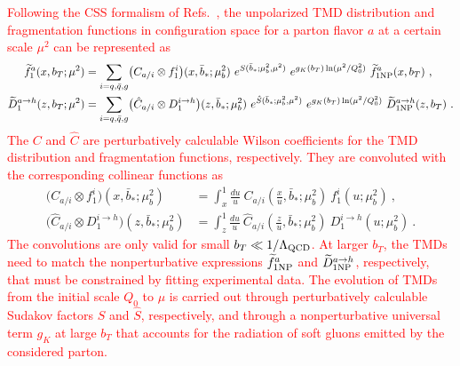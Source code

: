 \documentclass[aps,preprintnumbers,showpacs,nofootinbib,superscriptaddress,floatfix]{revtex4}
\begin{document}
\textcolor{red}{Following the CSS formalism of Refs.~\cite{Collins:2011zzd,Aybat:2011zv}, the unpolarized TMD distribution and fragmentation functions in configuration space for a parton flavor $a$ at a certain scale $\mu^2$ can be represented as}
\begin{align}   
\widetilde{f}_1^a (x,  b_T; \mu^2) &= \sum_{i=q,\bar q,g} \bigl( C_{a/i} \otimes f_1^i \bigr) (x, \bar{b}_{\ast}; \mu_b^2) 
\  e^{S (\bar{b}_{\ast}; \mu_b^2, \mu^2)} \  e^{g_K(b_T) \ln (\mu^2 / Q_0^2)} \  \widetilde{f}_{1 {\rm NP}}^a (x, b_T) \ ,
\label{e:TMDevol1} \\
\widetilde{D}_1^{a\to h} (z, b_T; \mu^2) &= \sum_{i=q,\bar q,g} \bigl( \hat{C}_{a/i} \otimes D_1^{i\to h} \bigr) (z, \bar{b}_{\ast}; \mu_b^2) \  e^{\hat{S} (\bar{b}_{\ast}; \mu_b^2, \mu^2)} \  e^{g_K( b_T) \ln (\mu^2 / Q_0^2)} \  \widetilde{D}_{1 {\rm NP}}^{a\to h} (z, b_T) \  .
\label{e:TMDevol2}
\end{align}
\textcolor{red}{The $C$ and $\hat{C}$ are perturbatively calculable Wilson coefficients for the TMD distribution and fragmentation functions, respectively. They are convoluted with the corresponding collinear functions as}
\begin{align}
\bigl( C_{a/i} \otimes f_1^i \bigr) (x, \bar{b}_{\ast}; \mu_b^2) &= \int_x^1 \frac{du}{u}\  C_{a/i} \left( \frac{x}{u}, \bar{b}_{\ast}; \mu_b^2 \right) \  f_1^i (u; \mu_b^2) \  , 
\label{e:WC1} \\
\bigl( \hat{C}_{a/i} \otimes D_1^{i\to h} \bigr) (z, \bar{b}_{\ast}; \mu_b^2) &= \int_z^1 \frac{du}{u}\  \hat{C}_{a/i} \left( \frac{z}{u}, \bar{b}_{\ast}; \mu_b^2 \right) \  D_1^{i\to h} (u; \mu_b^2) \  . 
\label{e:WC2}
\end{align}
\textcolor{red}{The convolutions are only valid for small $b_T \ll 1/\Lambda_{\rm QCD}$. At larger $b_T$, the TMDs need to match the nonperturbative expressions $\widetilde{f}_{1 \rm NP}^a$ and $\widetilde{D}_{1 {\rm NP}}^{a\to h}$, respectively, that must be constrained by fitting experimental data. The evolution of TMDs from the initial scale $Q_0$ to $\mu$ is carried out through perturbatively calculable Sudakov factors $S$ and $\hat{S}$, respectively, and through a nonperturbative universal term $g_K$ at large $b_T$ that accounts for the radiation of soft gluons emitted by the considered parton. }
\end{document}
